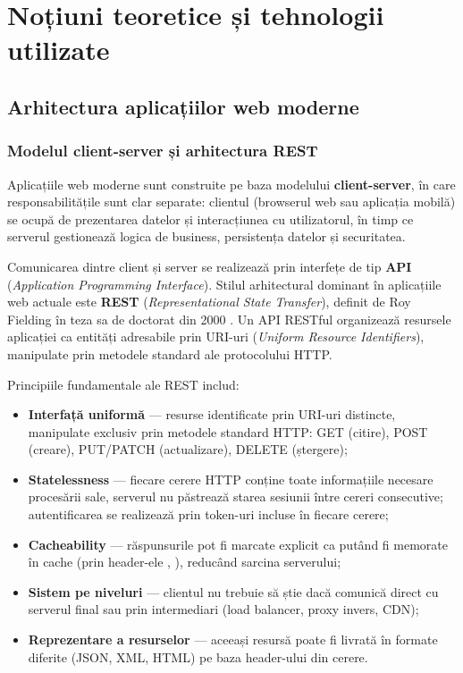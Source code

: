 \chapter{Noțiuni teoretice și tehnologii utilizate}

\section{Arhitectura aplicațiilor web moderne}

\subsection{Modelul client-server și arhitectura REST}

Aplicațiile web moderne sunt construite pe baza modelului \textbf{client-server}, în care responsabilitățile sunt clar separate: clientul (browserul web sau aplicația mobilă) se ocupă de prezentarea datelor și interacțiunea cu utilizatorul, în timp ce serverul gestionează logica de business, persistența datelor și securitatea.

Comunicarea dintre client și server se realizează prin interfețe de tip \textbf{API} (\textit{Application Programming Interface}). Stilul arhitectural dominant în aplicațiile web actuale este \textbf{REST} (\textit{Representational State Transfer}), definit de Roy Fielding în teza sa de doctorat din 2000 \cite{fielding2000rest}. Un API RESTful organizează resursele aplicației ca entități adresabile prin URI-uri (\textit{Uniform Resource Identifiers}), manipulate prin metodele standard ale protocolului HTTP.

Principiile fundamentale ale REST includ:

\begin{itemize}
  \item \textbf{Interfață uniformă} --- resurse identificate prin URI-uri distincte, manipulate exclusiv prin metodele standard HTTP: GET (citire), POST (creare), PUT/PATCH (actualizare), DELETE (ștergere);
  \item \textbf{Statelessness} --- fiecare cerere HTTP conține toate informațiile necesare procesării sale, serverul nu păstrează starea sesiunii între cereri consecutive; autentificarea se realizează prin token-uri incluse în fiecare cerere;
  \item \textbf{Cacheability} --- răspunsurile pot fi marcate explicit ca putând fi memorate în cache (prin header-ele , ), reducând sarcina serverului;
  \item \textbf{Sistem pe niveluri} --- clientul nu trebuie să știe dacă comunică direct cu serverul final sau prin intermediari (load balancer, proxy invers, CDN);
  \item \textbf{Reprezentare a resurselor} --- aceeași resursă poate fi livrată în formate diferite (JSON, XML, HTML) pe baza header-ului  din cerere.
\end{itemize}

